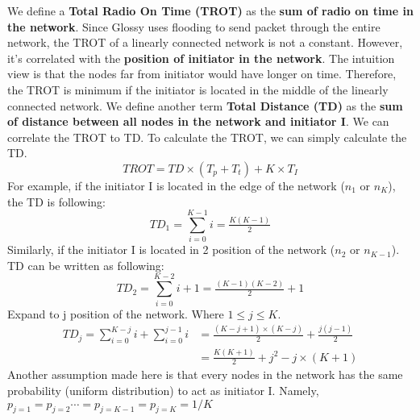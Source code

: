 We define a {\bf Total Radio On Time (TROT)} as the {\bf sum of radio on time in the network}. Since
Glossy uses flooding to send packet through the entire network, the TROT of a linearly connected
network is not a constant. However, it's correlated with the {\bf position of initiator in the
network}. The intuition view is that the nodes far from initiator would have longer on time. Therefore,
the TROT is minimum if the initiator is located in the middle of the linearly connected network.
We define another term {\bf Total Distance (TD)} as the {\bf sum of distance between all nodes in the network
and initiator I}. We can correlate the TROT to TD. To calculate the TROT, we can simply
calculate the TD.
\begin{equation}
	TROT = TD\times(T_p + T_t) + K\times T_I
	\label{eq:TROT_TD}
\end{equation}
For example, if the initiator I is located in the edge of the network ($n_1$ or $n_K$), the TD 
is following:
\begin{equation}
	TD_1 = \displaystyle\sum\limits_{i=0}^{K-1} i = \tfrac{K(K-1)}{2}
\end{equation}
Similarly, if the initiator I is located in 2 position of the network ($n_2$ or $n_{K-1}$).
TD can be written as following:
\begin{equation}
	TD_2 = \displaystyle\sum\limits_{i=0}^{K-2} i + 1 = \tfrac{(K-1)(K-2)}{2} + 1
\end{equation}
Expand to j position of the network. Where $1\le j\le K$.
\begin{align}
	TD_j = \displaystyle\sum\limits_{i=0}^{K-j} i + \displaystyle\sum\limits_{i=0}^{j-1} i &= \tfrac{(K-j+1)\times(K-j)}{2} + \tfrac{j(j-1)}{2}\\
	&=\tfrac{K(K+1)}{2} + j^2 - j\times(K+1)
\end{align}
Another assumption made here is that every nodes in the network has the same probability (uniform 
distribution) to act as initiator I. Namely, $p_{j=1} = p_{j=2} \cdots = p_{j=K-1} = p_{j=K} = 1/K$

